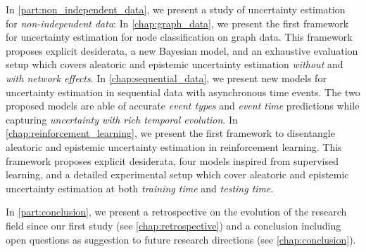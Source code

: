 In \cref{part:non_independent_data}, we present a study of uncertainty estimation for \emph{non-independent data}:
In \cref{chap:graph_data}, we present the first framework for uncertainty estimation for node classification on graph data. This framework proposes explicit desiderata, a new Bayesian model, and an exhaustive evaluation setup which covers aleatoric and epistemic uncertainty estimation \emph{without} and \emph{with network effects}.
In \cref{chap:sequential_data}, we present new models for uncertainty estimation in sequential data with asynchronous time events. The two proposed models are able of accurate \emph{event types} and \emph{event time} predictions while capturing \emph{uncertainty with rich temporal evolution}.
In \cref{chap:reinforcement_learning}, we present the first framework to disentangle aleatoric and epistemic uncertainty estimation in reinforcement learning. This framework proposes explicit desiderata, four models inspired from supervised learning, and a detailed experimental setup which cover aleatoric and epistemic uncertainty estimation at both \emph{training time} and \emph{testing time}.

In \cref{part:conclusion}, we present a retrospective on the evolution of the research field since our first study (see \cref{chap:retrospective}) and a conclusion including open questions as suggestion to future research directions (see \cref{chap:conclusion}).

